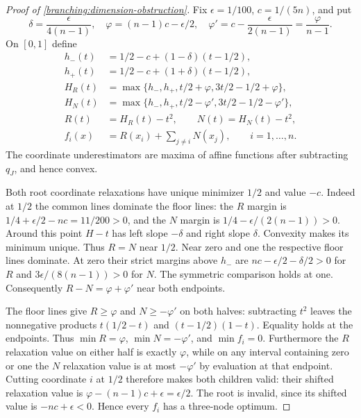 \begin{proof}[Proof of \cref{branching:dimension-obstruction}]
Fix $\epsilon=1/100$, $c=1/(5n)$, and put
\[
 \delta=\frac{\epsilon}{4(n-1)},\quad
 \varphi=(n-1)c-\epsilon/2,\quad
 \varphi'=c-\frac{\epsilon}{2(n-1)}=\frac{\varphi}{n-1}.
\]
On $[0,1]$ define
\begin{align*}
 h_-(t)&=1/2-c+(1-\delta)(t-1/2),\\
 h_+(t)&=1/2-c+(1+\delta)(t-1/2),\\
 H_R(t)&=\max\{h_-,h_+,t/2+\varphi,3t/2-1/2+\varphi\},\\
 H_N(t)&=\max\{h_-,h_+,t/2-\varphi',3t/2-1/2-\varphi'\},\\
 R(t)&=H_R(t)-t^2,\qquad N(t)=H_N(t)-t^2,\\
 f_i(x)&=R(x_i)+\sum_{j\ne i}N(x_j),\qquad i=1,\ldots,n.
\end{align*}
The coordinate underestimators are maxima of affine functions after
subtracting $q_J$, and hence convex.

Both root coordinate relaxations have unique minimizer $1/2$ and value
$-c$. Indeed at $1/2$ the common lines dominate the floor lines:
the $R$ margin is $1/4+\epsilon/2-nc=11/200>0$, and the $N$ margin
is $1/4-\epsilon/(2(n-1))>0$. Around this point $H-t$ has left slope
$-\delta$ and right slope $\delta$. Convexity makes its minimum
unique. Thus $R=N$ near $1/2$.
Near zero and one the respective floor lines dominate. At zero their
strict margins above $h_-$ are
$nc-\epsilon/2-\delta/2>0$ for $R$ and
$3\epsilon/(8(n-1))>0$ for $N$. The symmetric comparison holds at
one. Consequently $R-N=\varphi+\varphi'$ near both endpoints.

The floor lines give $R\ge\varphi$ and $N\ge-\varphi'$ on both
halves: subtracting $t^2$ leaves the nonnegative products
$t(1/2-t)$ and $(t-1/2)(1-t)$. Equality holds at the endpoints.
Thus $\min R=\varphi$, $\min N=-\varphi'$, and $\min f_i=0$.
Furthermore the $R$ relaxation value on either half is exactly
$\varphi$, while on any interval containing zero or one the $N$
relaxation value is at most $-\varphi'$ by evaluation at that endpoint.
Cutting coordinate $i$ at $1/2$ therefore makes both children valid:
their shifted relaxation value is
$\varphi-(n-1)c+\epsilon=\epsilon/2$.
The root is invalid, since its shifted value is $-nc+\epsilon<0$.
Hence every $f_i$ has a three-node optimum.


\end{proof}
